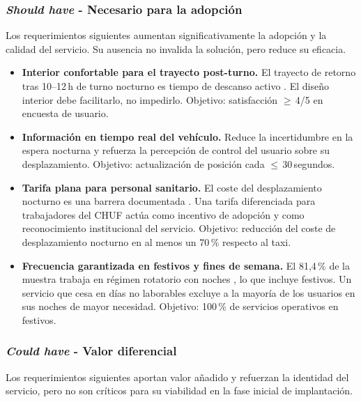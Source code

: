 \subsubsection{\textit{Should have} - Necesario para la adopción}
\label{sec:moscow-should}

Los requerimientos siguientes aumentan significativamente la adopción
y la calidad del servicio. Su ausencia no invalida la solución, pero
reduce su eficacia.

\begin{itemize}

	\item \textbf{Interior confortable para el trayecto post-turno.}
	El trayecto de retorno tras 10--12\,h de turno nocturno es tiempo
	de descanso activo \parencite{LouridoRegueira2026}. El diseño
	interior debe facilitarlo, no impedirlo.
	Objetivo: satisfacción $\geq$\,4/5 en encuesta de usuario.

	\item \textbf{Información en tiempo real del vehículo.}
	Reduce la incertidumbre en la espera nocturna y refuerza la
	percepción de control del usuario sobre su desplazamiento.
	Objetivo: actualización de posición cada $\leq$\,30\,segundos.

	\item \textbf{Tarifa plana para personal sanitario.}
	El coste del desplazamiento nocturno es una barrera documentada
	\parencite{LouridoRegueira2026}. Una tarifa diferenciada para
	trabajadores del CHUF actúa como incentivo de adopción y como
	reconocimiento institucional del servicio.
	Objetivo: reducción del coste de desplazamiento nocturno en al
	menos un 70\,\% respecto al taxi.

	\item \textbf{Frecuencia garantizada en festivos y fines de semana.}
	El 81,4\,\% de la muestra trabaja en régimen rotatorio con noches
	\parencite{LouridoRegueira2026}, lo que incluye festivos. Un
	servicio que cesa en días no laborables excluye a la mayoría de
	los usuarios en sus noches de mayor necesidad.
	Objetivo: 100\,\% de servicios operativos en festivos.

\end{itemize}

\subsubsection{\textit{Could have} - Valor diferencial}
\label{sec:moscow-could}

Los requerimientos siguientes aportan valor añadido y refuerzan
la identidad del servicio, pero no son críticos para su viabilidad
en la fase inicial de implantación.


